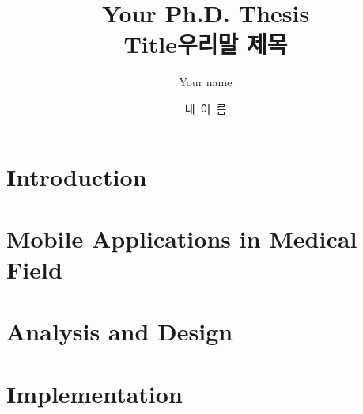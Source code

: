 \documentclass[oneside,phd]{snuthesis}
\title{Your Ph.D. Thesis \\ Title}
\title*{우리말 제목}
\author{Your name}
\author*{네~이~름} %
\begin{document}

%









\iffalse

\thispagestyle{empty}
\newpage
\mbox{}
\newpage

\makefrontcover
\makeapproval

\fi

\cleardoublepage














\tableofcontents

\cleardoublepage






\chapter*{Introduction}




\chapter{Mobile Applications in Medical Field}


%


\chapter{Analysis and Design}
\label{chp:paper01}



\chapter{Implementation}
\label{chp:paper02}













%
\end{document}
